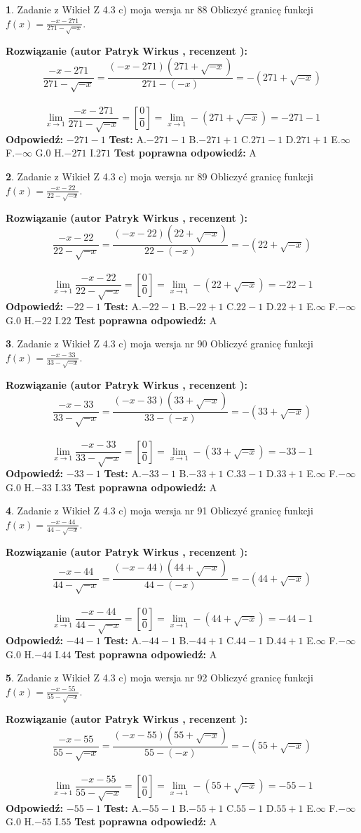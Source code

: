 \documentclass[12pt, a4paper]{article}
\theoremstyle{definition} %
\newtheorem{zad}{}
\newcommand{\zadStart}[1]{\begin{zad}#1\newline}
\newcommand{\zadStop}{\end{zad}}
\newcommand{\rozwStart}[2]{\noindent \textbf{Rozwiązanie (autor #1 , recenzent #2): }\newline}
\newcommand{\rozwStop}{\newline}
\newcommand{\odpStart}{\noindent \textbf{Odpowiedź:}\newline}
\newcommand{\odpStop}{\newline}
\newcommand{\testStart}{\noindent \textbf{Test:}\newline}
\newcommand{\testStop}{\newline}
\newcommand{\kluczStart}{\noindent \textbf{Test poprawna odpowiedź:}\newline}
\newcommand{\kluczStop}{\newline}
\begin{document}
\zadStart{Zadanie z Wikieł Z 4.3 c) moja wersja nr 88}
Obliczyć granicę funkcji $f(x)=\frac{-x-271}{271-\sqrt{-x}}$.
\zadStop
\rozwStart{Patryk Wirkus}{}
$$\frac{-x-271}{271-\sqrt{-x}}=\frac{(-x-271)(271+\sqrt{-x})}{271-(-x)}=-(271+\sqrt{-x})$$
\\
$$\lim\limits_{x\to1}\frac{-x-271}{271-\sqrt{-x}}=[\frac{0}{0}]=\lim\limits_{x\to1}-(271+\sqrt{-x}) =-271-1$$
\rozwStop
\odpStart
$-271-1$
\odpStop
\testStart
A.$-271-1$
B.$-271+1$
C.$271-1$
D.$271+1$
E.$\infty$
F.$-\infty$
G.$0$
H.$-271$
I.$271$
\testStop
\kluczStart
A
\kluczStop



\zadStart{Zadanie z Wikieł Z 4.3 c) moja wersja nr 89}
Obliczyć granicę funkcji $f(x)=\frac{-x-22}{22-\sqrt{-x}}$.
\zadStop
\rozwStart{Patryk Wirkus}{}
$$\frac{-x-22}{22-\sqrt{-x}}=\frac{(-x-22)(22+\sqrt{-x})}{22-(-x)}=-(22+\sqrt{-x})$$
\\
$$\lim\limits_{x\to1}\frac{-x-22}{22-\sqrt{-x}}=[\frac{0}{0}]=\lim\limits_{x\to1}-(22+\sqrt{-x}) =-22-1$$
\rozwStop
\odpStart
$-22-1$
\odpStop
\testStart
A.$-22-1$
B.$-22+1$
C.$22-1$
D.$22+1$
E.$\infty$
F.$-\infty$
G.$0$
H.$-22$
I.$22$
\testStop
\kluczStart
A
\kluczStop



\zadStart{Zadanie z Wikieł Z 4.3 c) moja wersja nr 90}
Obliczyć granicę funkcji $f(x)=\frac{-x-33}{33-\sqrt{-x}}$.
\zadStop
\rozwStart{Patryk Wirkus}{}
$$\frac{-x-33}{33-\sqrt{-x}}=\frac{(-x-33)(33+\sqrt{-x})}{33-(-x)}=-(33+\sqrt{-x})$$
\\
$$\lim\limits_{x\to1}\frac{-x-33}{33-\sqrt{-x}}=[\frac{0}{0}]=\lim\limits_{x\to1}-(33+\sqrt{-x}) =-33-1$$
\rozwStop
\odpStart
$-33-1$
\odpStop
\testStart
A.$-33-1$
B.$-33+1$
C.$33-1$
D.$33+1$
E.$\infty$
F.$-\infty$
G.$0$
H.$-33$
I.$33$
\testStop
\kluczStart
A
\kluczStop



\zadStart{Zadanie z Wikieł Z 4.3 c) moja wersja nr 91}
Obliczyć granicę funkcji $f(x)=\frac{-x-44}{44-\sqrt{-x}}$.
\zadStop
\rozwStart{Patryk Wirkus}{}
$$\frac{-x-44}{44-\sqrt{-x}}=\frac{(-x-44)(44+\sqrt{-x})}{44-(-x)}=-(44+\sqrt{-x})$$
\\
$$\lim\limits_{x\to1}\frac{-x-44}{44-\sqrt{-x}}=[\frac{0}{0}]=\lim\limits_{x\to1}-(44+\sqrt{-x}) =-44-1$$
\rozwStop
\odpStart
$-44-1$
\odpStop
\testStart
A.$-44-1$
B.$-44+1$
C.$44-1$
D.$44+1$
E.$\infty$
F.$-\infty$
G.$0$
H.$-44$
I.$44$
\testStop
\kluczStart
A
\kluczStop



\zadStart{Zadanie z Wikieł Z 4.3 c) moja wersja nr 92}
Obliczyć granicę funkcji $f(x)=\frac{-x-55}{55-\sqrt{-x}}$.
\zadStop
\rozwStart{Patryk Wirkus}{}
$$\frac{-x-55}{55-\sqrt{-x}}=\frac{(-x-55)(55+\sqrt{-x})}{55-(-x)}=-(55+\sqrt{-x})$$
\\
$$\lim\limits_{x\to1}\frac{-x-55}{55-\sqrt{-x}}=[\frac{0}{0}]=\lim\limits_{x\to1}-(55+\sqrt{-x}) =-55-1$$
\rozwStop
\odpStart
$-55-1$
\odpStop
\testStart
A.$-55-1$
B.$-55+1$
C.$55-1$
D.$55+1$
E.$\infty$
F.$-\infty$
G.$0$
H.$-55$
I.$55$
\testStop
\kluczStart
A
\kluczStop
\end{document}
